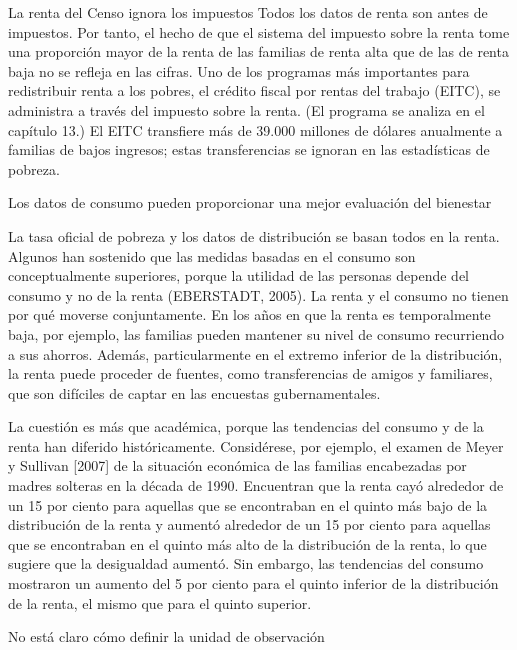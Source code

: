 \documentclass[10pt,a4paper]{article}
\begin{document}
La renta del Censo ignora los impuestos 
Todos los datos de renta son antes de impuestos. Por tanto, el hecho de que el sistema del impuesto sobre la renta tome una proporción mayor de la renta de las familias de renta alta que de las de renta baja no se refleja en las cifras. Uno de los programas más importantes para redistribuir renta a los pobres, el crédito fiscal por rentas del trabajo (EITC), se administra a través del impuesto sobre la renta. (El programa se analiza en el capítulo 13.) El EITC transfiere más de 39.000 millones de dólares anualmente a familias de bajos ingresos; estas transferencias se ignoran en las estadísticas de pobreza.



Los datos de consumo pueden proporcionar una mejor evaluación del bienestar 

La tasa oficial de pobreza y los datos de distribución se basan todos en la renta. Algunos han sostenido que las medidas basadas en el consumo son conceptualmente superiores, porque la utilidad de las personas depende del consumo y no de la renta (EBERSTADT, 2005). La renta y el consumo no tienen por qué moverse conjuntamente. En los años en que la renta es temporalmente baja, por ejemplo, las familias pueden mantener su nivel de consumo recurriendo a sus ahorros. Además, particularmente en el extremo inferior de la distribución, la renta puede proceder de fuentes, como transferencias de amigos y familiares, que son difíciles de captar en las encuestas gubernamentales.

La cuestión es más que académica, porque las tendencias del consumo y de la renta han diferido históricamente. Considérese, por ejemplo, el examen de Meyer y Sullivan [2007] de la situación económica de las familias encabezadas por madres solteras en la década de 1990. Encuentran que la renta cayó alrededor de un 15 por ciento para aquellas que se encontraban en el quinto más bajo de la distribución de la renta y aumentó alrededor de un 15 por ciento para aquellas que se encontraban en el quinto más alto de la distribución de la renta, lo que sugiere que la desigualdad aumentó. Sin embargo, las tendencias del consumo mostraron un aumento del 5 por ciento para el quinto inferior de la distribución de la renta, el mismo que para el quinto superior.

No está claro cómo definir la unidad de observación 
\end{document}
